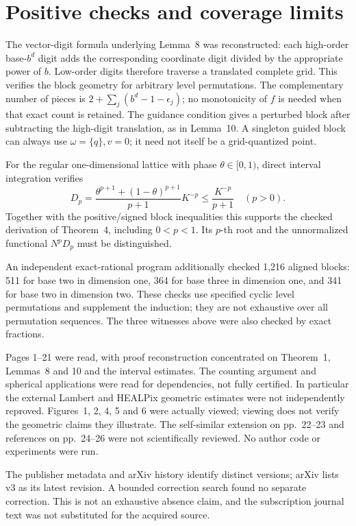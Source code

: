 \documentclass[10pt]{article}
\begin{document}
\section*{Positive checks and coverage limits}
The vector-digit formula underlying Lemma 8 was reconstructed: each high-order base-\(b^d\) digit adds the corresponding coordinate digit divided by the appropriate power of \(b\). Low-order digits therefore traverse a translated complete grid. This verifies the block geometry for arbitrary level permutations. The complementary number of pieces is \(2+\sum_j(b^d-1-\epsilon_j)\); no monotonicity of \(f\) is needed when that exact count is retained. The guidance condition gives a perturbed block after subtracting the high-digit translation, as in Lemma 10. A singleton guided block can always use \(\omega=\{q\},v=0\); it need not itself be a grid-quantized point.\par
For the regular one-dimensional lattice with phase \(\theta\in[0,1)\), direct interval integration verifies \[D_p=\frac{\theta^{p+1}+(1-\theta)^{p+1}}{p+1}K^{-p}
 \le\frac{K^{-p}}{p+1}\quad(p>0).\] Together with the positive/signed block inequalities this supports the checked derivation of Theorem 4, including \(0<p<1\). Its \(p\)-th root and the unnormalized functional \(N^pD_p\) must be distinguished.\par
An independent exact-rational program additionally checked 1,216 aligned blocks: 511 for base two in dimension one, 364 for base three in dimension one, and 341 for base two in dimension two. These checks use specified cyclic level permutations and supplement the induction; they are not exhaustive over all permutation sequences. The three witnesses above were also checked by exact fractions.\par
Pages 1–21 were read, with proof reconstruction concentrated on Theorem 1, Lemmas 8 and 10 and the interval estimates. The counting argument and spherical applications were read for dependencies, not fully certified. In particular the external Lambert and HEALPix geometric estimates were not independently reproved. Figures 1, 2, 4, 5 and 6 were actually viewed; viewing does not verify the geometric claims they illustrate. The self-similar extension on pp. 22–23 and references on pp. 24–26 were not scientifically reviewed. No author code or experiments were run.\par
The publisher metadata and arXiv history identify distinct versions; arXiv lists v3 as its latest revision. A bounded correction search found no separate correction. This is not an exhaustive absence claim, and the subscription journal text was not substituted for the acquired source.\par
\end{document}
